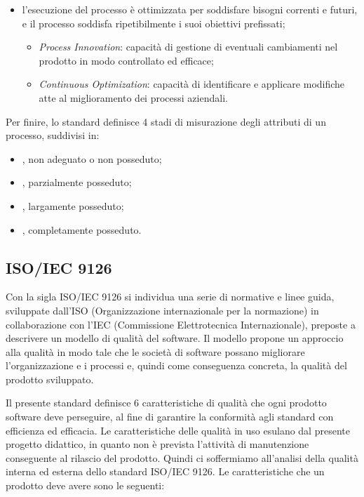 \begin{itemize}
\begin{itemize}
        \end{itemize}
     \item  {} l'esecuzione del processo è ottimizzata per soddisfare bisogni correnti e futuri, e il processo soddisfa ripetibilmente i suoi obiettivi prefissati;
            \begin{itemize}
            	\item \emph{Process Innovation}: capacità di gestione di eventuali cambiamenti nel prodotto in modo controllato ed efficace;
            	\item \emph{Continuous Optimization}: capacità di identificare e applicare modifiche atte al miglioramento dei processi aziendali.
            \end{itemize} 
\end{itemize}
Per finire, lo standard definisce 4 stadi di misurazione degli attributi di un processo, suddivisi in:
\begin{itemize}
	\item {}, non adeguato o non posseduto;
	\item {}, parzialmente posseduto;
	\item {}, largamente posseduto;
	\item {}, completamente posseduto.
\end{itemize}

\subsection{ISO/IEC 9126} %

Con la sigla ISO/IEC 9126 si individua una serie di normative e linee guida, sviluppate dall'ISO (Organizzazione internazionale per la normazione) in collaborazione con l'IEC (Commissione Elettrotecnica Internazionale), preposte a descrivere un modello di qualità del software. Il modello propone un approccio alla qualità in modo tale che le società di software possano migliorare l'organizzazione e i processi e, quindi come conseguenza concreta, la qualità del prodotto sviluppato.


Il presente standard definisce 6 caratteristiche di qualità che ogni prodotto software deve perseguire, al fine di garantire la conformità agli standard con efficienza ed efficacia. Le caratteristiche delle qualità in uso esulano dal presente progetto didattico, in quanto non è prevista l'attività di manutenzione conseguente al rilascio del prodotto. Quindi ci soffermiamo all'analisi della qualità interna ed esterna dello standard ISO/IEC 9126.
Le caratteristiche che un prodotto deve avere sono le seguenti:


